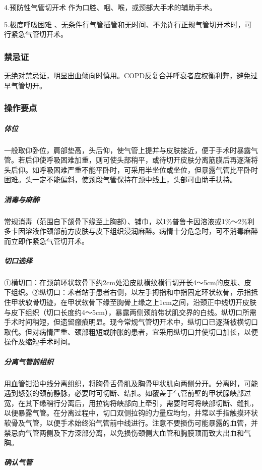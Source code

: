 4.预防性气管切开术 作为口腔、咽、喉，或颈部大手术的辅助手术。

5.极度呼吸困难
、无条件行气管插管和无时间、不允许行正规气管切开术时，可行紧急气管切开术。

\subsubsection{禁忌证}

无绝对禁忌证，明显出血倾向时慎用。COPD反复合并呼衰者应权衡利弊，避免过早气管切开。

\subsubsection{操作要点}

\subparagraph{体位}

一般取仰卧位，肩部垫高，头后仰，使气管上提并与皮肤接近，便于手术时暴露气管。若后仰使呼吸困难加重，则可使头部稍平，或待切开皮肤分离筋膜后再逐渐将头后仰。如呼吸困难严重不能平卧时，可采用半坐位或坐位，但暴露气管比平卧时困难。头一定不能偏斜，使颈段气管保持在颈中线上，头部可由助手扶持。

\subparagraph{消毒与麻醉}

常规消毒（范围自下颌骨下缘至上胸部）、铺巾，以1\%普鲁卡因溶液或1\%～2\%利多卡因溶液作颈部前方皮肤与皮下组织浸润麻醉。病情十分危急时，可不消毒麻醉而立即作紧急气管切开术。

\subparagraph{切口选择}

①横切口：在颈前环状软骨下约2cm处沿皮肤横纹横行切开长4～5cm的皮肤、皮下组织。②纵切口：术者站于患者右侧，以左手拇指和中指固定环状软骨，示指抵住甲状软骨切迹，在甲状软骨下缘至胸骨上缘之上1cm之间，沿颈正中线切开皮肤与皮下组织（切口长度约4～5cm），暴露两侧颈前带状肌交界的白线。纵切口所需手术时间稍短，但遗留瘢痕明显。现今常规气管切开术中，纵切口已逐渐被横切口取代。但对病情严重、颈部粗短或肿胀的患者，宜采用纵切口并使切口加长，以便操作及缩短手术时间。

\subparagraph{分离气管前组织}

用血管钳沿中线分离组织，将胸骨舌骨肌及胸骨甲状肌向两侧分开。分离时，可能遇到怒张的颈前静脉，必要时可切断、结扎。如覆盖于气管前壁的甲状腺峡部过宽，在其下缘稍行分离后，用拉钩将峡部向上牵引，需要时可将峡部切断、缝扎，以便暴露气管。在分离过程中，切口双侧拉钩的力量应均匀，并常以手指触摸环状软骨及气管，以便手术始终沿气管前中线进行。注意不要损伤可能暴露的血管，并禁忌向气管两侧及下方深部分离，以免损伤颈侧大血管和胸膜顶而致大出血和气胸。

\subparagraph{确认气管}

